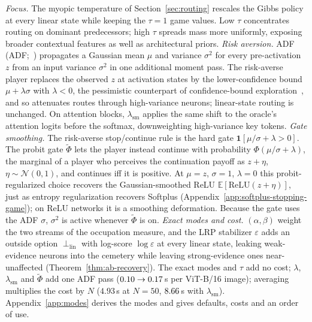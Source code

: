 \documentclass[twoside]{article}
\newif\ifch \chfalse
\newcommand{\ch}[1]{\ifch\textcolor{magenta}{#1}\else#1\fi}
\providecommand{\E}{}
\renewcommand{\E}{\mathbb{E}}
\newcommand{\relu}{\text{ReLU}}
\newcommand{\1}{\mathbf{1}}
\begin{document}
\ch{\emph{Focus.} The myopic temperature of Section~\ref{sec:routing} rescales the Gibbs policy at every linear state while keeping the $\tau{=}1$ game values. Low $\tau$ concentrates routing on dominant predecessors; high $\tau$ spreads mass more uniformly, exposing broader contextual features as well as architectural priors.}
\ch{\emph{Risk aversion.} \Acl{ADF} (\acs{ADF};~\citealp{gast2018lightweight}) propagates a
Gaussian mean $\mu$ and variance $\sigma^2$ for every pre-activation $z$ from an input variance
$\sigma^2$ in one additional moment pass. The risk-averse player replaces the observed $z$ at
activation states by the lower-confidence bound $\mu+\lambda\sigma$ with $\lambda<0$, the
pessimistic counterpart of confidence-bound exploration~\citep{auer2002finite, zhang2021risk}, and
so attenuates routes through high-variance neurons; linear-state routing is unchanged. On attention
blocks, $\lambda_{\mathrm{sm}}$ applies the same shift to the oracle's attention logits before the
softmax, downweighting high-variance key tokens.}
\ch{\emph{Gate smoothing.} The risk-averse stop/continue rule is the hard gate
$\1[\mu/\sigma+\lambda>0]$. The probit gate $\tilde\Phi$ lets the player instead continue with
probability $\Phi(\mu/\sigma+\lambda)$, the marginal of a player who perceives the continuation
payoff as $z+\eta$, $\eta\sim\mathcal N(0,1)$, and continues iff it is positive. At $\mu{=}z$,
$\sigma{=}1$, $\lambda{=}0$ this probit-regularized choice recovers the Gaussian-smoothed ReLU
$\E[\relu(z+\eta)]$, just as entropy regularization recovers
Softplus (Appendix~\ref{app:softplus-stopping-game}); on ReLU networks it is a smoothing
deformation. Because the gate uses the \ac{ADF} $\sigma$, $\sigma^2$ is active whenever
$\tilde\Phi$ is on.}
\ch{\emph{Exact modes and cost.} $(\alpha,\beta)$ weight the two streams of the occupation
measure, and the \ac{LRP} stabilizer $\varepsilon$ adds an outside option $\perp_{\mathrm{lin}}$
with log-score $\log\varepsilon$ at every linear state, leaking weak-evidence neurons into the
cemetery while leaving strong-evidence ones near-unaffected (Theorem~\ref{thm:ab-recovery}). The
exact modes and $\tau$ add no cost; $\lambda$, $\lambda_{\mathrm{sm}}$ and $\tilde\Phi$ add one
\ac{ADF} pass ($0.10\to0.17$\,s per ViT-B/16 image); averaging multiplies the
cost by $N$ ($4.93$\,s at $N{=}50$, $8.66$\,s with $\lambda_{\mathrm{sm}}$).
Appendix~\ref{app:modes} derives the modes and gives defaults, costs and an order of use.}
\end{document}
